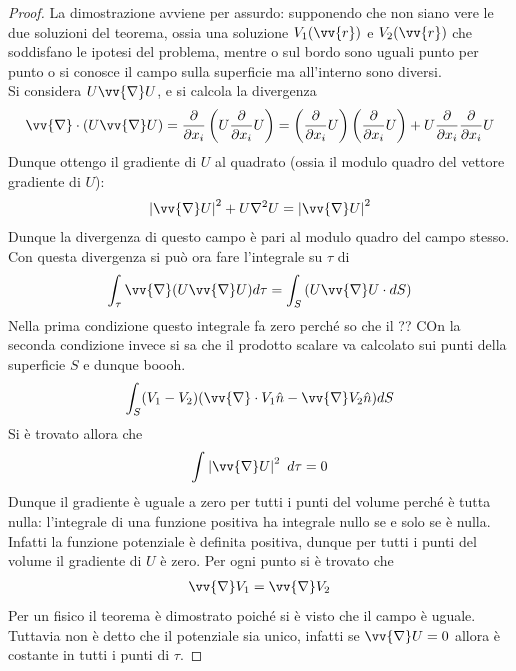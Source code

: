 \documentclass[a4paper, oneside]{article}
\begin{document}
\begin{proof}
    La dimostrazione avviene per assurdo: supponendo che non siano vere le due soluzioni del teorema, 
    ossia una soluzione $V_1(\vv{r} )$ e $V_2(\vv{r} )$ che soddisfano le ipotesi del problema, mentre o 
    sul bordo sono uguali punto per punto o si conosce il campo sulla superficie ma all'interno sono diversi. \\
    Si considera $U\vv{\nabla}U$, e si calcola la divergenza
    \begin{gather*}
        \vv{\nabla} \cdot (U\vv{\nabla}U) = \frac{\partial }{\partial x_i} \left(U \frac{\partial }{\partial x_i} U\right) = \left(\frac{\partial }{\partial x_i}U \right) \left(\frac{\partial }{\partial x_i}U \right) + U \frac{\partial }{\partial x_i}\frac{\partial }{\partial x_i}U  
    \end{gather*}
    Dunque ottengo il gradiente di $U$ al quadrato (ossia il modulo quadro del vettore 
    gradiente di $U$):
    \begin{gather*}
        \left| \vv{\nabla} U  \right|^{2} + U \nabla^{2}U  = \left| \vv{\nabla}U  \right|^{2} 
    \end{gather*}
    Dunque la divergenza di questo campo è pari al modulo quadro del campo stesso. Con questa divergenza
    si può ora fare l'integrale su $\tau$ di
    \begin{gather*}
        \int_{\tau} \vv{\nabla}(U \vv{\nabla}U ) d\tau = \int_{S} \left(U \vv{\nabla}U \cdot dS \right)   
    \end{gather*}
    Nella prima condizione questo integrale fa zero perché so che il ?? COn la seconda condizione 
    invece si sa che il prodotto scalare va calcolato sui punti della superficie $S$ e dunque boooh. 
    \begin{gather*}
        \int_{S}^{} (V_1 - V_2) (\vv{\nabla} \cdot V_1 \hat{n} - \vv{\nabla}V_2 \hat{n}    ) dS 
    \end{gather*}
    Si è trovato allora che 
    \begin{gather*}
        \int_{}^{}\left| \vv{\nabla} U  \right|^{2} \ d\tau = 0  
    \end{gather*}
    Dunque il gradiente è uguale a zero per tutti i punti del volume perché è tutta nulla:
    l'integrale di una funzione positiva ha integrale nullo se e solo se è nulla. Infatti la funzione 
    potenziale è definita positiva, dunque per tutti i punti del volume il gradiente
    di $U$ è zero.
    Per ogni punto si è trovato che
    \begin{gather*}
        \vv{\nabla}V_1 = \vv{\nabla}V_2  
    \end{gather*}
    Per un fisico il teorema è dimostrato poiché si è visto che il 
    campo è uguale. Tuttavia non è detto che il potenziale sia unico, infatti se
    $\vv{\nabla} U = 0$ allora è costante in tutti i punti di $\tau$. 
\end{proof}
\end{document}
